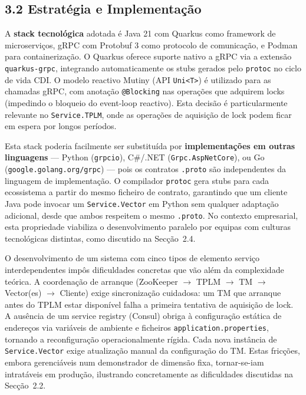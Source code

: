 \subsection*{3.2 Estratégia e Implementação}

A \textbf{stack tecnológica} adotada é Java 21 com Quarkus como framework de microserviços,
gRPC com Protobuf 3 como protocolo de comunicação, e Podman para containerização. O Quarkus
oferece suporte nativo a gRPC via a extensão \texttt{quarkus-grpc}, integrando automaticamente
os stubs gerados pelo \texttt{protoc} no ciclo de vida CDI. O modelo reactivo Mutiny (API
\texttt{Uni<T>}) é utilizado para as chamadas gRPC, com anotação \texttt{@Blocking} nas
operações que adquirem locks (impedindo o bloqueio do event-loop reactivo). Esta decisão é
particularmente relevante no \texttt{Service.TPLM}, onde as operações de aquisição de lock
podem ficar em espera por longos períodos.

Esta stack poderia facilmente ser substituída por \textbf{implementações em outras linguagens}
--- Python (\texttt{grpcio}), C\#/.NET (\texttt{Grpc.AspNetCore}), ou Go
(\texttt{google.golang.org/grpc}) --- pois os contratos \texttt{.proto} são independentes da
linguagem de implementação. O compilador \texttt{protoc} gera stubs para cada ecossistema a
partir do mesmo ficheiro de contrato, garantindo que um cliente Java pode invocar um
\texttt{Service.Vector} em Python sem qualquer adaptação adicional, desde que ambos respeitem
o mesmo \texttt{.proto}. No contexto empresarial, esta propriedade viabiliza o desenvolvimento
paralelo por equipas com culturas tecnológicas distintas, como discutido na Secção~2.4.

O desenvolvimento de um sistema com cinco tipos de elemento serviço interdependentes impôs
dificuldades concretas que vão além da complexidade teórica. A coordenação de arranque
(ZooKeeper $\to$ TPLM $\to$ TM $\to$ Vector(es) $\to$ Cliente) exige sincronização cuidadosa:
um TM que arranque antes do TPLM estar disponível falha a primeira tentativa de aquisição de
lock. A ausência de um service registry (Consul) obriga à configuração estática de endereços
via variáveis de ambiente e ficheiros \texttt{application.properties}, tornando a reconfiguração
operacionalmente rígida. Cada nova instância de \texttt{Service.Vector} exige atualização manual
da configuração do TM. Estas fricções, embora gerenciáveis num demonstrador de dimensão fixa,
tornar-se-iam intratáveis em produção, ilustrando concretamente as dificuldades discutidas na
Secção~2.2.

